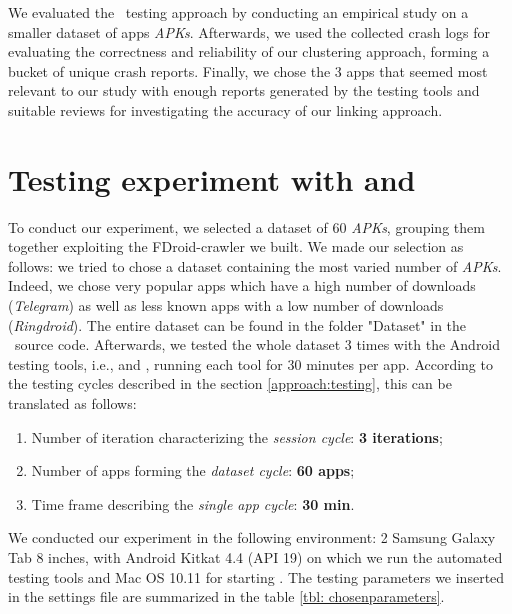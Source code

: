 \label{chapter:results}
We evaluated the \toolname\ testing approach by conducting an empirical study on a smaller dataset of apps  \textit{APKs}.
Afterwards, we used the collected crash logs for evaluating the correctness and reliability of our clustering approach, forming a bucket of unique crash reports. 
Finally, we chose the 3 apps that seemed most relevant to our study with enough reports generated by the testing tools and suitable reviews for investigating the accuracy of our linking approach. 

\section{Testing experiment with \monkey and \sapienz}
To conduct our experiment, we selected a dataset of 60 \textit{APKs}, grouping them together exploiting the FDroid-crawler we built. 
We made our selection as follows: we tried to chose a dataset containing the most varied number of \textit{APKs}. Indeed, we chose very popular apps which have a high number of downloads (\eg \textit{Telegram}) as well as less known apps with a low number of downloads (\eg \textit{Ringdroid}). 
The entire dataset can be found in the folder "Dataset" in the \toolname\ source code.  
Afterwards, we tested the whole dataset 3 times with the Android testing tools, i.e., \monkey and \sapienz, running each tool for 30 minutes per app.
According to the testing cycles described in the section \ref{approach:testing}, this can be translated as follows: 
\begin{enumerate}
\item Number of iteration characterizing the \textit{session cycle}: \textbf{3 iterations}; 
\item Number of apps forming the \textit{dataset cycle}: \textbf{60 apps}; 
\item Time frame describing the \textit{single app cycle}: \textbf{30 min}.
\end{enumerate}
We conducted our experiment in the following environment: 2 Samsung Galaxy Tab 8 inches, with Android Kitkat 4.4 (API 19) on which we run the automated testing tools and Mac OS 10.11 for starting \toolname.
The testing parameters we inserted in the settings file are summarized in the table \ref{tbl: chosenparameters}. 
